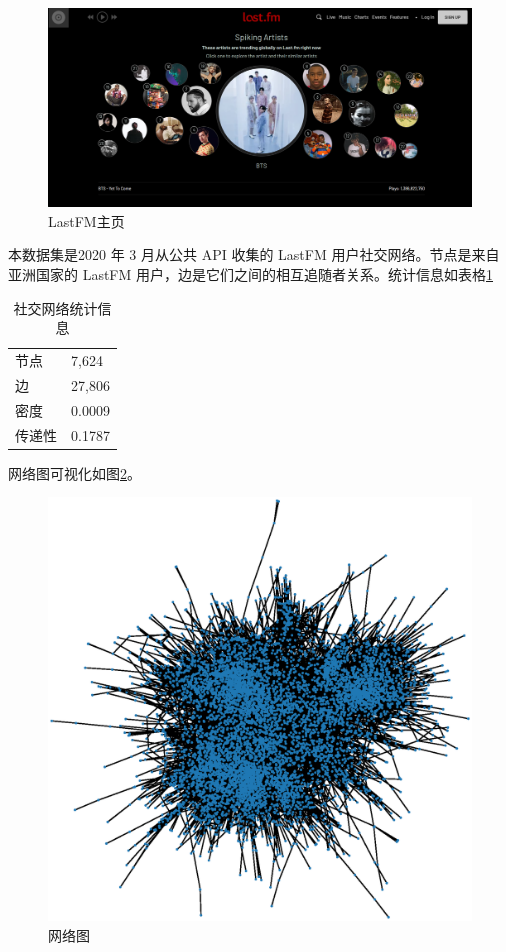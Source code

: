 \documentclass[10pt, a4paper]{article}
\begin{document}
\begin{figure}[tbph!]
	\centering
	\includegraphics[width=0.7\linewidth]{figures/LastFM主页}
	\caption{LastFM主页}
	\label{fig:lastfm}
\end{figure}

本数据集\cite{rozemberczki2020characteristic}是2020 年 3 月从公共 API 收集的 LastFM 用户社交网络。节点是来自亚洲国家的 LastFM 用户，边是它们之间的相互追随者关系。统计信息如表格\ref{tab:st-of-social}

\begin{table}[!htbp]
	\centering
		\begin{tabular}{ll}
			\hline
			节点  & 7,624                          \\
			边   & 27,806 \\
			密度  & 0.0009 \\
			传递性 & 0.1787\\
			\hline
		\end{tabular}%
	\caption{社交网络统计信息}
	\label{tab:st-of-social}
\end{table}

网络图可视化如图\ref{fig:raw-graph}。

\begin{figure}[tbph!]
	\centering
	\includegraphics[width=0.7\linewidth]{figures/网络图}
	\caption{网络图}
	\label{fig:raw-graph}
\end{figure}
\end{document}
